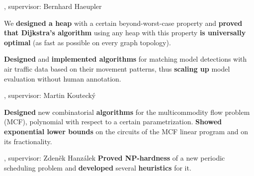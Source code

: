 , supervisor: Bernhard Haeupler

\: We {\bf designed a heap} with a certain beyond-worst-case property and {\bf proved that Dijkstra's algorithm} using any heap with this property {\bf is universally optimal} (as fast as possible on every graph topology).
\endlist


%
\: {\bf Designed} and {\bf implemented algorithms} for matching model detections with air traffic data based on their movement patterns, thus {\bf scaling up} model evaluation without human annotation.
%
\endlist

, supervisor: Martin Koutecký

%
\: {\bf Designed} new combinatorial {\bf algorithms} for the multicommodity flow problem (MCF), polynomial with respect to a certain parametrization.
\: {\bf Showed exponential lower bounds} on the circuits of the MCF linear program and on its fractionality.
\endlist

, supervisor: Zdeněk Hanzálek
%
%
\: {\bf Proved NP-hardness} of a new periodic scheduling problem and {\bf
developed} several {\bf heuristics} for it.
\endlist


